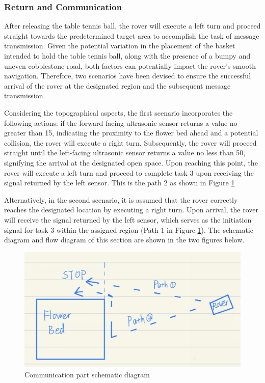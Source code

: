 \documentclass[12pt, a4paper, oneside]{report}
\begin{document}
\subsubsection{Return and Communication}   
After releasing the table tennis ball, the rover will execute a left turn and proceed straight towards the predetermined target area to accomplish the task of message transmission. Given the potential variation in the placement of the basket intended to hold the table tennis ball, along with the presence of a bumpy and uneven cobblestone road, both factors can potentially impact the rover's smooth navigation. Therefore, two scenarios have been devised to ensure the successful arrival of the rover at the designated region and the subsequent message transmission.

Considering the topographical aspects, the first scenario incorporates the following actions: if the forward-facing ultrasonic sensor returns a value no greater than 15, indicating the proximity to the flower bed ahead and a potential collision, the rover will execute a right turn. Subsequently, the rover will proceed straight until the left-facing ultrasonic sensor returns a value no less than 50, signifying the arrival at the designated open space. Upon reaching this point, the rover will execute a left turn and proceed to complete task 3 upon receiving the signal returned by the left sensor. This is the path 2 as shown in Figure \ref{cpsd}

Alternatively, in the second scenario, it is assumed that the rover correctly reaches the designated location by executing a right turn. Upon arrival, the rover will receive the signal returned by the left sensor, which serves as the initiation signal for task 3 within the assigned region (Path 1 in Figure \ref{cpsd}). The schematic diagram and flow diagram of this section are shown in the two figures below.

\begin{figure}[H]
    \centering
    \includegraphics[scale=0.35]{pic/Patio 2/Fig11.png}
    \caption{Communication part schematic diagram}
    \label{cpsd}    
\end{figure}
\end{document}
